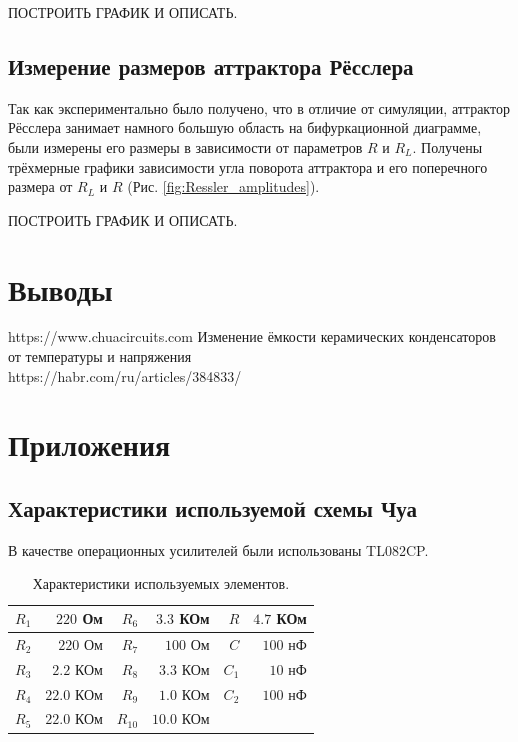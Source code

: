\documentclass[12pt]{article}
\begin{document}
ПОСТРОИТЬ ГРАФИК И ОПИСАТЬ. 

\subsection*{Измерение размеров аттрактора Рёсслера}
Так как экспериментально было получено, что в отличие от симуляции, аттрактор 
Рёсслера занимает намного большую область на бифуркационной диаграмме, были измерены 
его размеры в зависимости от параметров $R$ и $R_L$. Получены трёхмерные графики зависимости угла поворота аттрактора и 
его поперечного размера от $R_L$ и $R$ (Рис. \ref{fig:Ressler_amplitudes}).

ПОСТРОИТЬ ГРАФИК И ОПИСАТЬ. 


\section*{Выводы}

\begin{thebibliography}{9}
	https://www.chuacircuits.com
	Изменение ёмкости керамических конденсаторов от температуры и напряжения \\ https://habr.com/ru/articles/384833/
\end{thebibliography}

\section*{Приложения}
\subsection*{Характеристики используемой схемы Чуа}
В качестве операционных усилителей были использованы TL082CP.
\begin{table}[H]
	\centering
	\begin{tabular}{|r|r|r|r|r|r|}
		\hline
		$R_1$ & $220$ Ом   & $R_6$  & $3.3$ КОм  & $R$   & $4.7$ КОм \\ \hline
		$R_2$ & $220$ Ом   & $R_7$  & $100$ Ом   & $C$   & $100$ нФ  \\ \hline
		$R_3$ & $2.2$ КОм  & $R_8$  & $3.3$ КОм  & $C_1$ & $10$ нФ   \\ \hline
		$R_4$ & $22.0$ КОм & $R_9$  & $1.0$ КОм  & $C_2$ & $100$ нФ  \\ \hline
		$R_5$ & $22.0$ КОм & $R_{10}$ & $10.0$ КОм &       &           \\ \hline
	\end{tabular}
	\caption{Характеристики используемых элементов.}
	\label{tab:curcuit_chars}
\end{table}
\end{document}
